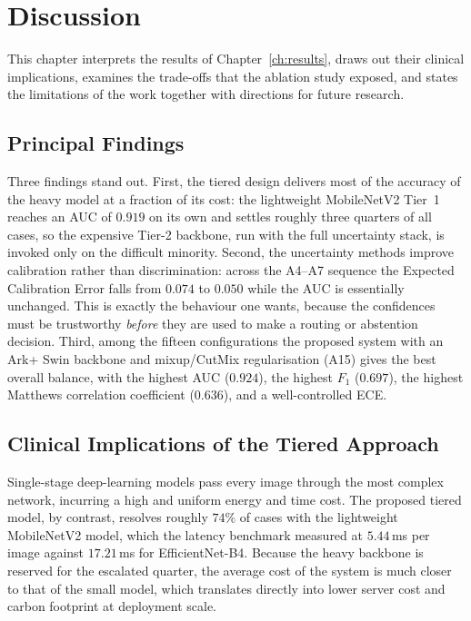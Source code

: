 \chapter{Discussion}
\label{ch:discussion}

This chapter interprets the results of Chapter~\ref{ch:results}, draws out their clinical implications, examines the trade-offs that the ablation study exposed, and states the limitations of the work together with directions for future research.

\section{Principal Findings}
Three findings stand out. First, the tiered design delivers most of the accuracy of the heavy model at a fraction of its cost: the lightweight MobileNetV2 Tier~1 reaches an AUC of $0.919$ on its own and settles roughly three quarters of all cases, so the expensive Tier-2 backbone, run with the full uncertainty stack, is invoked only on the difficult minority. Second, the uncertainty methods improve calibration rather than discrimination: across the A4--A7 sequence the Expected Calibration Error falls from $0.074$ to $0.050$ while the AUC is essentially unchanged. This is exactly the behaviour one wants, because the confidences must be trustworthy \emph{before} they are used to make a routing or abstention decision. Third, among the fifteen configurations the proposed system with an Ark+ Swin backbone and mixup/CutMix regularisation (A15) gives the best overall balance, with the highest AUC ($0.924$), the highest $F_1$ ($0.697$), the highest Matthews correlation coefficient ($0.636$), and a well-controlled ECE.

\section{Clinical Implications of the Tiered Approach}
Single-stage deep-learning models pass every image through the most complex network, incurring a high and uniform energy and time cost. The proposed tiered model, by contrast, resolves roughly $74\%$ of cases with the lightweight MobileNetV2 model, which the latency benchmark measured at $5.44$\,ms per image against $17.21$\,ms for EfficientNet-B4. Because the heavy backbone is reserved for the escalated quarter, the average cost of the system is much closer to that of the small model, which translates directly into lower server cost and carbon footprint at deployment scale.

